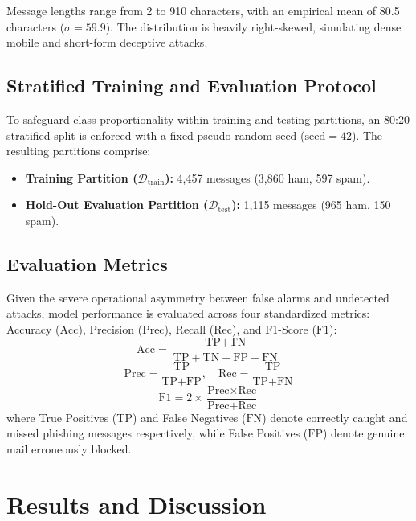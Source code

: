 \documentclass[conference]{IEEEtran}
\begin{document}
Message lengths range from 2 to 910 characters, with an empirical mean of 80.5 characters ($\sigma = 59.9$). The distribution is heavily right-skewed, simulating dense mobile and short-form deceptive attacks.

\subsection{Stratified Training and Evaluation Protocol}
To safeguard class proportionality within training and testing partitions, an 80:20 stratified split is enforced with a fixed pseudo-random seed ($\text{seed} = 42$). The resulting partitions comprise:
\begin{itemize}
    \item \textbf{Training Partition ($\mathcal{D}_{\text{train}}$):} 4,457 messages (3,860 ham, 597 spam).
    \item \textbf{Hold-Out Evaluation Partition ($\mathcal{D}_{\text{test}}$):} 1,115 messages (965 ham, 150 spam).
\end{itemize}

\subsection{Evaluation Metrics}
Given the severe operational asymmetry between false alarms and undetected attacks, model performance is evaluated across four standardized metrics: Accuracy ($\text{Acc}$), Precision ($\text{Prec}$), Recall ($\text{Rec}$), and F1-Score ($\text{F1}$):
\begin{equation}
    \text{Acc} = \frac{\text{TP} + \text{TN}}{\text{TP} + \text{TN} + \text{FP} + \text{FN}}
\end{equation}
\begin{equation}
    \text{Prec} = \frac{\text{TP}}{\text{TP} + \text{FP}}, \quad \text{Rec} = \frac{\text{TP}}{\text{TP} + \text{FN}}
\end{equation}
\begin{equation}
    \text{F1} = 2 \times \frac{\text{Prec} \times \text{Rec}}{\text{Prec} + \text{Rec}}
\end{equation}
where True Positives ($\text{TP}$) and False Negatives ($\text{FN}$) denote correctly caught and missed phishing messages respectively, while False Positives ($\text{FP}$) denote genuine mail erroneously blocked.

\section{Results and Discussion}
\end{document}
